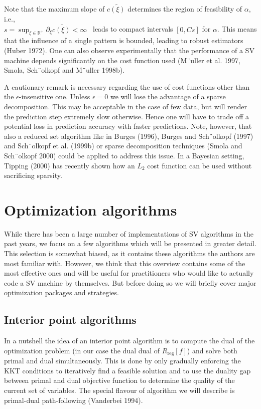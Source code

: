 \documentclass[fleqn,10pt]{olplainarticle}
\begin{document}
Note that the maximum slope of $c\tilde{(\xi)}$ determines the region of feasibility of $\alpha$, i.e., \\$s = \sup_{\xi \in \mathbb{R}^+} \partial_\xi c\tilde{(\xi)} < \infty$ \ leads to compact intervals $[0, Cs]$ for $\alpha$. This means that the influence of a single pattern is bounded, leading to robust estimators (Huber 1972). One can also observe experimentally that the performance of a SV machine depends significantly on the cost function used (M¨uller et al. 1997, Smola, Sch¨olkopf and M¨uller 1998b).

A cautionary remark is necessary regarding the use of cost functions other than the $\epsilon$-insensitive one. Unless $\epsilon = 0$ we will lose the advantage of a sparse decomposition. This may be acceptable in the case of few data, but will render the prediction step extremely slow otherwise. Hence one will have to trade off a potential loss in prediction accuracy with faster predictions. Note, however, that also a reduced set algorithm like in Burges (1996), Burges and Sch¨olkopf (1997) and Sch¨olkopf et al. (1999b) or sparse decomposition techniques (Smola and Sch¨olkopf 2000) could be applied to address this issue. In a Bayesian setting, Tipping (2000) has recently shown how an $L_2$ cost function can be used without sacrificing sparsity.

\section{Optimization algorithms}
While there has been a large number of implementations of SV algorithms in the past years, we focus on a few algorithms which will be presented in greater detail. This selection is somewhat biased, as it contains these algorithms the authors are most familiar with. However, we think that this overview contains some
of the most effective ones and will be useful for practitioners who would like to actually code a SV machine by themselves. But before doing so we will briefly cover major optimization packages and strategies.

\subsection{Interior point algorithms}

In a nutshell the idea of an interior point algorithm is to compute the dual of the optimization problem (in our case the dual dual of $R_{\text{reg}}[ f ]$) and solve both primal and dual simultaneously. This is done by only gradually enforcing the KKT conditions to iteratively find a feasible solution and to use the duality gap between primal and dual objective function to determine the quality of the current set of variables. The special flavour of algorithm we will describe is primal-dual path-following (Vanderbei 1994).
\end{document}
